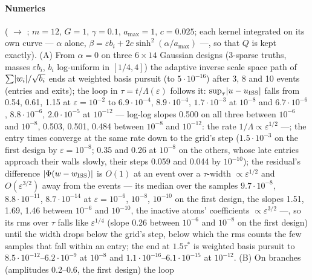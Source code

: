 \begin{sloppypar}
\paragraph{Numerics} ( $\to$ ; $m = 12$, $G = 1$,
$\gamma = 0.1$, $a_{\max} = 1$, $c = 0.025$; each kernel integrated on its own curve --- $\alpha$ alone,
$\beta = \varepsilon b_i + 2c\sinh^2(\alpha/a_{\max})$ ---, so that $Q$ is kept exactly). (A) From $\alpha = 0$ on three
$6\times14$ Gaussian designs (3-sparse truths, masses $\varepsilon b_i$, $b_i$ log-uniform in $[1/4,4]$) the adaptive
inverse scale space path of $\sum\lvert w_i\rvert/\sqrt{b_i}$ ends at weighted basis pursuit (to $5\cdot10^{-16}$) after 3, 8
and 10 events (entries and exits); the loop in $\tau = t/\Lambda(\varepsilon)$ follows it:
$\sup_\tau\lvert u - u_{\mathrm{ISS}}\rvert$ falls from 0.54, 0.61, 1.15 at $\varepsilon = 10^{-2}$ to $6.9\cdot10^{-4}$,
$8.9\cdot10^{-4}$, $1.7\cdot10^{-3}$ at $10^{-8}$ and $6.7\cdot10^{-6}$, $8.8\cdot10^{-6}$, $2.0\cdot10^{-5}$ at
$10^{-12}$ --- log-log slopes 0.500 on all three between $10^{-6}$ and $10^{-8}$, 0.503, 0.501, 0.484 between $10^{-8}$
and $10^{-12}$: the rate $1/\Lambda\propto\varepsilon^{1/2}$ ---; the entry times converge at the same rate down to the
grid's step ($1.5\cdot10^{-3}$ on the first design by $\varepsilon = 10^{-8}$; 0.35 and 0.26 at $10^{-8}$ on the
others, whose late entries approach their walls slowly, their steps 0.059 and 0.044 by $10^{-10}$); the residual's
difference $\lvert \Phi(w - w_{\mathrm{ISS}})\rvert$ is $O(1)$ at an event over a $\tau$-width $\propto\varepsilon^{1/2}$ and
$O(\varepsilon^{3/2})$ away from the events --- its median over the samples $9.7\cdot10^{-8}$, $8.8\cdot10^{-11}$,
$8.7\cdot10^{-14}$ at $\varepsilon = 10^{-6}$, $10^{-8}$, $10^{-10}$ on the first design, the slopes 1.51, 1.69, 1.46
between $10^{-6}$ and $10^{-10}$, the inactive atoms' coefficients $\propto\varepsilon^{3/2}$ ---, so its rms over $\tau$
falls like $\varepsilon^{1/4}$ (slope 0.26 between $10^{-6}$ and $10^{-8}$ on the first design) until the width drops
below the grid's step, below which the rms counts the few samples that fall within an entry; the end at $1.5\tau^*$ is
weighted basis pursuit to $8.5\cdot10^{-12}$--$6.2\cdot10^{-9}$ at $10^{-8}$ and
$1.1\cdot10^{-16}$--$6.1\cdot10^{-15}$ at $10^{-12}$. (B) On branches (amplitudes 0.2--0.6, the first design) the loop

\end{sloppypar}
